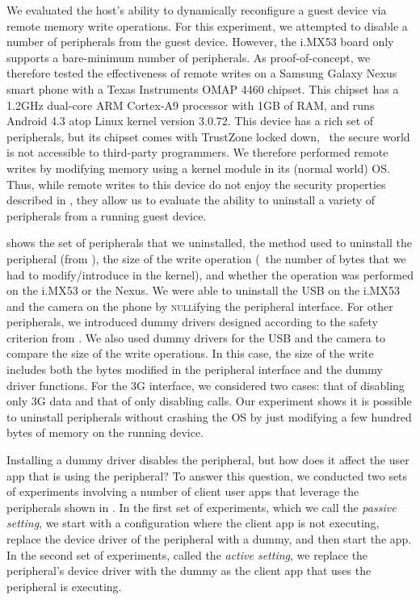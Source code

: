 

%
We evaluated the host's ability to dynamically reconfigure a guest device via
remote memory write operations. For this experiment, we attempted to disable a
number of peripherals from the guest device. However, the i.MX53 board only
supports a bare-minimum number of peripherals. As proof-of-concept, we
therefore tested the effectiveness of remote writes on a Samsung Galaxy Nexus
smart phone with a Texas Instruments OMAP 4460 chipset. This chipset has a
1.2GHz dual-core ARM Cortex-A9 processor with 1GB of RAM, and runs Android 4.3
atop Linux kernel version 3.0.72. This device has a rich set of peripherals,
but its chipset comes with TrustZone locked down, \ie~the secure world is not
accessible to third-party programmers.  We therefore performed remote writes by
modifying memory using a kernel module in its (normal world) OS.  Thus, while
remote writes to this device do not enjoy the security properties described in
, they allow us to evaluate the ability to uninstall
a variety of peripherals from a running guest device.

 shows the set of peripherals that we uninstalled, the
method used to uninstall the peripheral (from ), the
size of the write operation (\ie~the number of bytes that we had to
modify/introduce in the kernel), and whether the operation was performed on the
i.MX53 or the Nexus. We were able to uninstall the USB on the i.MX53 and the
camera on the phone by \textsc{null}ifying the peripheral interface. For other
peripherals, we introduced dummy drivers designed according to the safety
criterion from . We also used dummy drivers for the
USB and the camera to compare the size of the write operations. In this case,
the size of the write includes both the bytes modified in the peripheral
interface and the dummy driver functions. For the 3G interface, we considered
two cases: that of disabling only 3G data and that of only disabling calls. Our
experiment shows it is possible to uninstall peripherals without crashing the
OS by just modifying a few hundred bytes of memory on the running device. 

Installing a dummy driver disables the peripheral, but how does it affect the
user app that is using the peripheral? To answer this question, we conducted
two sets of experiments involving a number of client user apps that leverage
the peripherals shown in .  In the first set of
experiments, which we call the \textit{passive setting}, we start with a
configuration where the client app is not executing, replace the device driver
of the peripheral with a dummy, and then start the app. In the second set of
experiments, called the \textit{active setting}, we replace the peripheral's
device driver with the dummy as the client app that uses the peripheral is
executing. 

